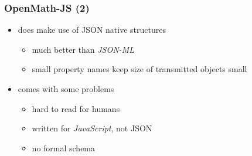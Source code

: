 \documentclass[usenames,dvipsnames]{beamer}
\begin{document}
\begin{frame}[fragile]
    \frametitle{OpenMath-JS (2)}
    \begin{itemize}
        \item does make use of JSON native structures
        \begin{itemize}
            \item much better than \textit{JSON-ML}
            \item small property names keep size of transmitted objects small
        \end{itemize}
        \item comes with some problems
        \begin{itemize}
            \item hard to read for humans
            \item written for \textit{JavaScript}, not JSON
            \item no formal schema
        \end{itemize}
    \end{itemize}
\end{frame}


\end{document}
